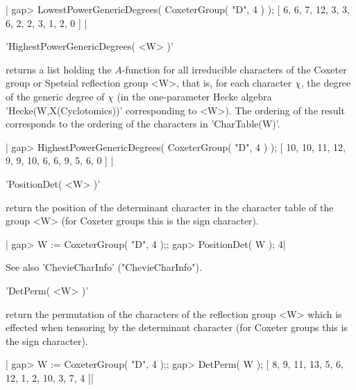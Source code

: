 |    gap> LowestPowerGenericDegrees( CoxeterGroup( "D", 4 ) );
    [ 6, 6, 7, 12, 3, 3, 6, 2, 2, 3, 1, 2, 0 ] |


'HighestPowerGenericDegrees( <W> )'

returns  a list holding the $A$-function  for all irreducible characters of
the  Coxeter  group  or  Spetsial  reflection  group <W>, that is, for each
character  $\chi$,  the  degree  of  the  generic  degree of $\chi$ (in the
one-parameter  Hecke  algebra  'Hecke(W,X(Cyclotomics))'  corresponding  to
<W>).  The  ordering  of  the  result  corresponds  to  the ordering of the
characters in 'CharTable(W)'.

|    gap> HighestPowerGenericDegrees( CoxeterGroup( "D", 4 ) );
    [ 10, 10, 11, 12, 9, 9, 10, 6, 6, 9, 5, 6, 0 ] |


'PositionDet( <W> )'

return  the position of the determinant character in the character table of
the group <W> (for Coxeter groups this is the sign character).

|    gap> W := CoxeterGroup( "D", 4 );;
    gap> PositionDet( W );
    4|

See also 'ChevieCharInfo' ("ChevieCharInfo").


'DetPerm( <W> )'

return  the permutation of the characters of the reflection group <W> which
is effected when tensoring by the determinant character (for Coxeter groups
this is the sign character).

|    gap> W := CoxeterGroup( "D", 4 );;
    gap> DetPerm( W );
    [ 8, 9, 11, 13, 5, 6, 12, 1, 2, 10, 3, 7, 4 ]|

